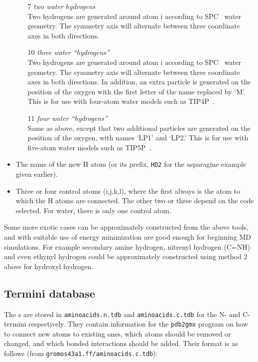 \begin{itemize}
\begin{enumerate}
\item[7]{\em two water hydrogens}\\
Two hydrogens are generated around atom i according to
SPC~\cite{Berendsen81} water geometry. The symmetry axis will
alternate between three coordinate axes in both directions.

\item[10]{\em three water ``hydrogens''}\\
Two hydrogens are generated around atom i according to
SPC~\cite{Berendsen81} water geometry. The symmetry axis will
alternate between three coordinate axes in both directions. In addition,
an extra particle is generated on the position of the oxygen with
the first letter of the name replaced by `M'. This is for
use with four-atom water models such as TIP4P~\cite{Jorgensen83}.

\item[11]{\em four water ``hydrogens''}\\
Same as above, except that two additional
particles are generated on the position of the oxygen, with names
`LP1' and `LP2.' This is for
use with five-atom water models such as TIP5P~\cite{Mahoney2000a}.
\end{enumerate}

\item
The name of the new H atom (or its prefix, {\eg} {\tt HD2} for
the asparagine example given earlier).

\item
Three or four control atoms (i,j,k,l), where the first always is the
atom to which the H atoms are connected. The other two or three depend
on the code selected. For water, there is only one control atom.
\end{itemize}

Some more exotic cases can be approximately constructed from the above tools,
and with suitable use of energy minimization are good enough for beginning
MD simulations. For example secondary amine hydrogen, nitrenyl hydrogen
(C\nolinebreak[4]=\nolinebreak[4]NH) and even ethynyl hydrogen could be
approximately constructed using method 2 above for hydroxyl hydrogen.

\subsection{Termini database}
\label{subsec:tdb}
The s are stored in {\tt aminoacids.n.tdb} and
{\tt aminoacids.c.tdb} for the N- and C-termini respectively. They contain
information for the {\tt pdb2gmx} program on how to connect new atoms
to existing ones, which atoms should be removed or changed, and which
bonded interactions should be added. Their format is as follows
(from {\tt gromos43a1.ff/aminoacids.c.tdb}):

